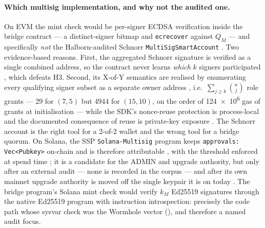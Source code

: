 \paragraph{Which multisig implementation, and why not the audited one.} On EVM the mint check would
be per-signer ECDSA verification inside the bridge contract --- a distinct-signer bitmap and
\texttt{ecrecover} against $Q_M$ --- and specifically \emph{not} the Halborn-audited Schnorr
\texttt{Multi\allowbreak{}Sig\allowbreak{}Smart\allowbreak{}Account} . Two
evidence-based reasons. First, the aggregated Schnorr signature is verified as a single combined
address, so the contract never learns \emph{which} $k$ signers participated
, which defeats H3. Second, its
X-of-Y semantics are realised by enumerating every qualifying signer subset as a separate owner
address ,
i.e.\ $\sum_{j \ge k}\binom{n}{j}$ role grants --- 29 for $(7,5)$ but \num{4944} for $(15,10)$, on the
order of \num{124e6} gas of grants at initialisation \srcinferred --- while the SDK's nonce-reuse
protection is process-local and the documented consequence of reuse is private-key exposure
. The Schnorr account is the
right tool for a 2-of-2 wallet and the wrong tool for a bridge quorum. On Solana, the SSP
\texttt{Solana-\allowbreak{}Multisig} program keeps \texttt{approvals:\allowbreak{} Vec<Pubkey>} on-chain and is therefore
attributable , with the
threshold enforced at spend time ;
it is a candidate for the ADMIN and upgrade authority, but only after an external audit --- none is
recorded in the corpus --- and after its own mainnet upgrade authority is moved off the single
keypair it is on today . The bridge program's
Solana mint check would verify $k_M$ Ed25519 signatures through the native Ed25519 program with
instruction introspection: precisely the code path whose sysvar check was the Wormhole vector
(), and therefore a named audit focus.

